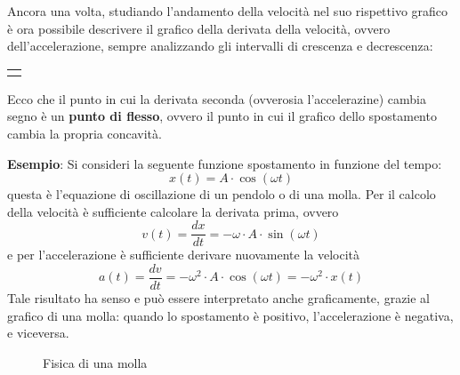 \documentclass[a4paper]{extarticle}
\begin{document}
\vspace{1em}
\noindent
Ancora una volta, studiando l'andamento della velocità nel suo rispettivo grafico è ora possibile descrivere il grafico della derivata della velocità, ovvero dell'accelerazione, sempre analizzando gli intervalli di crescenza e decrescenza:

\vspace{2em}
\noindent
{}
\begin{tabularx}{\textwidth}{P}
  {
      \centering
  }
\end{tabularx}

\vspace{1em}
\noindent
Ecco che il punto in cui la derivata seconda (ovverosia l'accelerazine) cambia segno è un \textbf{punto di flesso}, ovvero il punto in cui il grafico dello spostamento cambia la propria concavità.

\vspace{1em}
\noindent
\textbf{Esempio}: Si consideri la seguente funzione spostamento in funzione del tempo:
\[x(t) = A \cdot \cos(\omega t)\]
questa è l'equazione di oscillazione di un pendolo o di una molla. Per il calcolo della velocità è sufficiente calcolare la derivata prima, ovvero
\[v(t) = \frac{dx}{dt} = -\omega \cdot A \cdot \sin(\omega t)\]
e per l'accelerazione è sufficiente derivare nuovamente la velocità
\[a(t) = \frac{dv}{dt} = -\omega^2 \cdot A \cdot \cos(\omega t) = -\omega^2 \cdot x(t)\]
Tale risultato ha senso e può essere interpretato anche graficamente, grazie al grafico di una molla: quando lo spostamento è positivo, l'accelerazione è negativa, e viceversa.

\begin{figure}[H]
  \centering
  \caption{Fisica di una molla}
  \label{fig:fisica_molla}
\end{figure}
\end{document}
